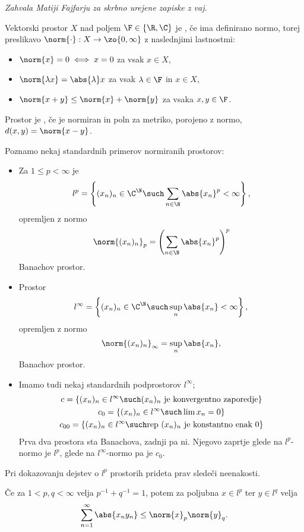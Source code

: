 \textit{Zahvala Matiji Fajfarju za skrbno urejene zapiske z vaj.}


Vektorski prostor $X$ nad poljem $\F \in \{\R, \C\}$ je , če ima
definirano normo, torej preslikavo $\norm{\cdot}: X \to \zo{0, \infty}$ z
naslednjimi lastnostmi:
\begin{itemize}
\item $\norm{x} = 0 \iff x = 0$ za vsak $x \in X$,
\item $\norm{\lambda x} = \abs{\lambda} x$ za vsak $\lambda \in \F$ in $x \in
  X$,
\item $\norm{x+y} \le \norm{x} + \norm{y}$ za vsaka $x, y \in \F$.
\end{itemize}
Prostor je , če je normiran in poln za metriko, porojeno z
normo, $d(x,y) = \norm{x-y}$.

Poznamo nekaj standardnih primerov normiranih prostorov:
\begin{itemize}
\item Za $1 \le p < \infty$ je
  \[
	l^p = \left\{ (x_n)_n \in \C^\N \such \sum_{n \in \N} \abs{x_n}^p < \infty
	\right\},
  \]
  opremljen z normo
  \[
	\norm{(x_n)_n}_p = \left( \sum_{n \in \N} \abs{x_n}^p \right)^p
  \]
  Banachov prostor.
\item Prostor
  \[
	l^\infty = \left\{ (x_n)_n \in \C^\N \such \sup_n \abs{x_n} < \infty \right\},
  \]
  opremljen z normo
  \[
	\norm{(x_n)_n}_\infty = \sup_n \abs{x_n},
  \]
  Banachov prostor.
\item Imamo tudi nekaj standardnih podprostorov $l^\infty$;
  \begin{gather*}
	c = \{(x_n)_n \in l^\infty \such \text{$(x_n)_n$ je konvergentno
	  zaporedje}\} \\
	c_0 = \{(x_n)_n \in l^\infty \such \lim x_n = 0\} \\
	c_{00} = \{ (x_n)_n \in l^\infty \such \text{rep $(x_n)_n$ je konstantno
	  enak $0$} \}
  \end{gather*}
  Prva dva prostora sta Banachova, zadnji pa ni.
  Njegovo zaprtje glede na $l^p$-normo je $l^p$, glede na $l^\infty$-normo pa je
  $c_0$.
\end{itemize}

Pri dokazovanju dejstev o $l^p$ prostorih prideta prav sledeči neenakosti.

\begin{trditev}
  Če za $1 < p, q < \infty$ velja $p^{-1} + q^{-1} = 1$, potem za poljubna $x
  \in l^p$ ter $y \in l^q$ velja
  \[
	\sum_{n=1}^\infty \abs{x_n y_n} \le \norm{x}_p \norm{y}_q.
  \]
\end{trditev}


